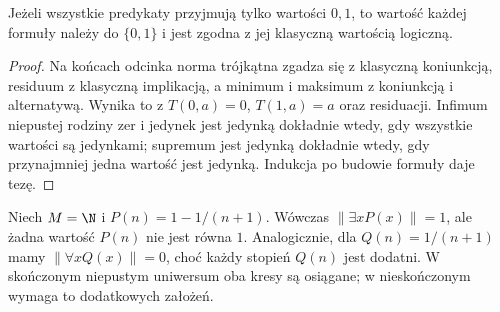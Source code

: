 \begin{stwierdzenie}
\label{prop:lst-fuzzy-crisp-reduction}
Jeżeli wszystkie predykaty przyjmują tylko wartości $0,1$,
to wartość każdej formuły należy do $\{0,1\}$ i jest zgodna
z jej klasyczną wartością logiczną.
\end{stwierdzenie}
\begin{proof}
Na końcach odcinka norma trójkątna zgadza się z klasyczną
koniunkcją, residuum z klasyczną implikacją, a minimum
i maksimum z koniunkcją i alternatywą. Wynika to z
$T(0,a)=0$, $T(1,a)=a$ oraz residuacji.
Infimum niepustej rodziny zer i jedynek jest jedynką
dokładnie wtedy, gdy wszystkie wartości są jedynkami;
supremum jest jedynką dokładnie wtedy, gdy przynajmniej
jedna wartość jest jedynką. Indukcja po budowie formuły
daje tezę.
\end{proof}

\begin{przyklad}\label{ex:lst-fuzzy-no-witness}
Niech $M=\N$ i $P(n)=1-1/(n+1)$.
Wówczas $\|\exists xP(x)\|=1$, ale żadna wartość
$P(n)$ nie jest równa $1$. Analogicznie, dla
$Q(n)=1/(n+1)$ mamy $\|\forall xQ(x)\|=0$,
choć każdy stopień $Q(n)$ jest dodatni.
W skończonym niepustym uniwersum oba kresy są osiągane;
w nieskończonym wymaga to dodatkowych założeń.
\end{przyklad}

